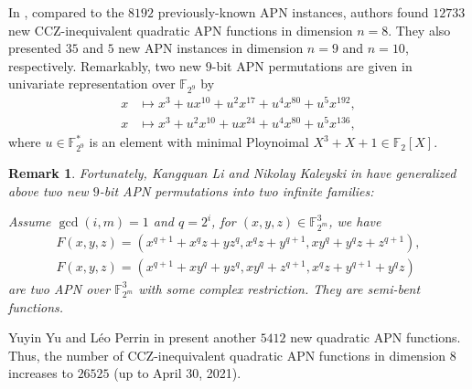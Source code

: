 \documentclass[12pt,a4paper]{ctexbook}
\newcommand{\0}{\textbf{0}}
\newcommand{\1}{\textbf{1}}
\newcommand{\F}{\mathbb{F}}
\newtheorem{remark}{Remark}
\begin{document}
    In \cite{Beierle2022search_quadAPN}, compared to the $ 8192 $ previously-known APN instances, 
    authors found $ 12733 $ new CCZ-inequivalent quadratic APN functions in dimension $ n=8 $.
    They also presented $ 35 $ and $ 5 $ new APN instances in dimension $ n=9 $ and $ n=10 $, respectively.
    Remarkably, two new $ 9 $-bit APN permutations are given in univariate representation over $ \F_{2^9} $ by 
    \begin{align*}
        x&\mapsto x^3+ux^{10}+u^2x^{17}+u^4x^{80}+u^5x^{192},\\
        x&\mapsto x^3+u^2x^{10}+ux^{24}+u^4x^{80}+u^5x^{136},
    \end{align*}
    where $ u\in\F_{2^9}^* $ is an element with minimal Ploynoimal $ X^3+X+1\in\F_2[X] $. 
    \begin{remark}
        Fortunately, Kangquan Li and Nikolay Kaleyski in \cite{Li2022trivariateAPN} 
        have generalized above two new $ 9 $-bit APN permutations into two infinite families:
        
        Assume $ \gcd(i,m)=1 $ and $ q=2^i $, for $ (x,y,z)\in\F_{2^m}^3 $, we have 
        \begin{align*}
            F(x, y, z) =(x^{q+1} + x^qz + yz^q, x^qz + y^{q+1}, xy^q + y^qz + z^{q+1}),\\
            F(x, y, z) =(x^{q+1} + xy^q + yz^q, xy^q + z^{q+1}, x^qz + y^{q+1} + y^qz)
        \end{align*}
        are two APN over $ \F_{2^m}^3 $ with some complex restriction. They are semi-bent functions.
    \end{remark}
    Yuyin Yu and Léo Perrin in \cite{Yu2022search_quadAPN} present another $ 5412 $ new quadratic APN functions. 
    Thus, the number of CCZ-inequivalent quadratic APN functions in dimension $ 8 $ increases to $ 26525 $ (up to April 30, 2021).
    
\end{document}
